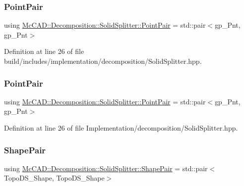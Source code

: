 \subsubsection{\texorpdfstring{Point\+Pair}{PointPair}\hspace{0.1cm}{\footnotesize\ttfamily [1/2]}}
{\footnotesize\ttfamily using \hyperlink{classMcCAD_1_1Decomposition_1_1SolidSplitter_af1bd2cdc22fc3e59277ea6fd04afc42b}{Mc\+C\+A\+D\+::\+Decomposition\+::\+Solid\+Splitter\+::\+Point\+Pair} =  std\+::pair$<$gp\+\_\+\+Pnt, gp\+\_\+\+Pnt$>$\hspace{0.3cm}{\ttfamily [private]}}



Definition at line 26 of file build/includes/implementation/decomposition/\+Solid\+Splitter.\+hpp.

\mbox{\label{classMcCAD_1_1Decomposition_1_1SolidSplitter_af1bd2cdc22fc3e59277ea6fd04afc42b}} 
\subsubsection{\texorpdfstring{Point\+Pair}{PointPair}\hspace{0.1cm}{\footnotesize\ttfamily [2/2]}}
{\footnotesize\ttfamily using \hyperlink{classMcCAD_1_1Decomposition_1_1SolidSplitter_af1bd2cdc22fc3e59277ea6fd04afc42b}{Mc\+C\+A\+D\+::\+Decomposition\+::\+Solid\+Splitter\+::\+Point\+Pair} =  std\+::pair$<$gp\+\_\+\+Pnt, gp\+\_\+\+Pnt$>$\hspace{0.3cm}{\ttfamily [private]}}



Definition at line 26 of file Implementation/decomposition/\+Solid\+Splitter.\+hpp.

\mbox{\label{classMcCAD_1_1Decomposition_1_1SolidSplitter_a6d92618f3790cfc7403c6f421bd66411}} 
\subsubsection{\texorpdfstring{Shape\+Pair}{ShapePair}\hspace{0.1cm}{\footnotesize\ttfamily [1/2]}}
{\footnotesize\ttfamily using \hyperlink{classMcCAD_1_1Decomposition_1_1SolidSplitter_a6d92618f3790cfc7403c6f421bd66411}{Mc\+C\+A\+D\+::\+Decomposition\+::\+Solid\+Splitter\+::\+Shape\+Pair} =  std\+::pair$<$Topo\+D\+S\+\_\+\+Shape, Topo\+D\+S\+\_\+\+Shape$>$\hspace{0.3cm}{\ttfamily [private]}}



